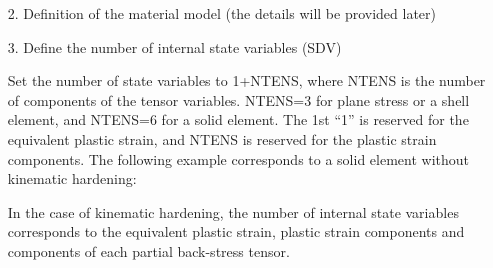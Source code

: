 \documentclass[11pt,a4paper,twoside,final,onecolumn,titlepage]{article}
\begin{document}
\begin{enumerate}
		\item[2.] Definition of the material model (the details will be provided later)\\
		\par
		\texttt{}
		\par\bigskip
\end{enumerate}

\begin{enumerate}		
		\item[3.] Define the number of internal state variables (SDV)
		\item[] Set the number of state variables to 1+NTENS, where NTENS is the number of components of the tensor variables. NTENS=3 for plane stress or a shell element, and NTENS=6 for a solid element. The 1st “1” is reserved for the equivalent plastic strain, and NTENS is reserved for the plastic strain components. The following example corresponds to a solid element without kinematic hardening:\\
		\par
		\texttt{}	
		\par\bigskip
		\item[] In the case of kinematic hardening, the number of internal state variables corresponds to the equivalent plastic strain, plastic strain components and components of each partial back-stress tensor. 
		\par\bigskip
\end{enumerate}
\end{document}
